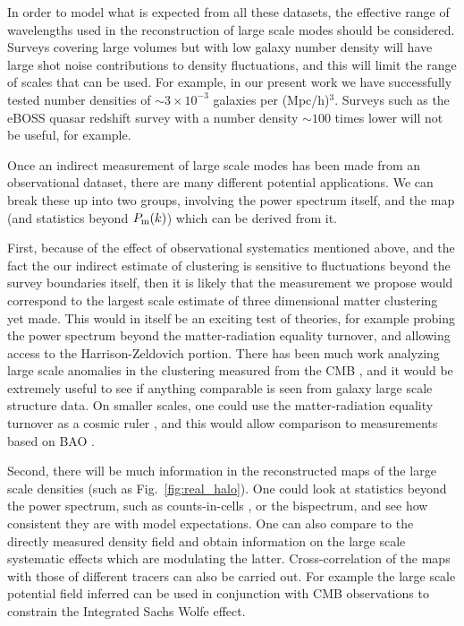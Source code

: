 \documentclass[prd,amsmath,amssymb,floatfix,superscriptaddress,nofootinbib,twocolumn]{revtex4-1}
\newcommand{\rf}[1]{\ref{fig:#1}}
\begin{document}
In order to model what is expected from all these datasets, the effective range of wavelengths used in the reconstruction of large scale modes should be considered. Surveys covering large volumes but with low galaxy number density will have large shot noise contributions to density fluctuations, and this will limit the range of scales that can be used. For example, in our present work we have successfully tested number densities of $\sim 3\times10^{-3}$ galaxies per (Mpc/h)$^{3}$. Surveys such as the eBOSS quasar redshift survey \cite{Ata:2017dya} with a number density $\sim 100$ times lower will not be useful, for example.

Once an indirect measurement of large scale modes has been made from an observational dataset, there are many different potential applications. We can break these up into two groups, involving the power spectrum itself, and the map (and statistics beyond $P_{\rm m}(k)$) which can be derived from it.

First, because of the effect of observational systematics mentioned above, and the fact the our indirect estimate of clustering is sensitive to fluctuations beyond the survey boundaries itself, then it is likely that the measurement we propose would correspond to the largest scale estimate of three dimensional matter clustering yet made. This would in itself be an exciting test of theories, for example probing the power spectrum beyond the matter-radiation equality turnover, and allowing access to the Harrison-Zeldovich portion. There has been much work analyzing large scale anomalies in the clustering measured from the CMB \cite{Copi:2010na}\cite{Rassat:2014yna}\cite{Schwarz:2015cma}, and it would be extremely useful to see if anything comparable is seen from galaxy large scale structure data. On smaller scales, one could use the matter-radiation equality turnover as a cosmic ruler \cite{Hasenkamp:2012ii}, and this would allow comparison to measurements based on BAO \cite{Lazkoz:2007cc}.

Second, there will be much information in the reconstructed maps of the large scale densities (such as Fig.~\rf{real_halo}). One could look at statistics beyond the power spectrum, such as counts-in-cells \cite{Yang:2011cic}, or the bispectrum, and see how consistent they are with model expectations. One can also compare to the directly measured density field and obtain information on the large scale systematic effects which are modulating the latter. Cross-correlation of the maps with those of different tracers can also be carried out. For example the large scale potential field inferred can be used in conjunction with CMB observations to constrain the Integrated Sachs Wolfe effect\cite{Nishizawa:2014vga}.
\end{document}
